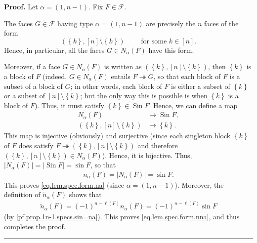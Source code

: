 \documentclass[12pt]{article}
\theoremstyle{definition}%
\theoremstyle{definition}%
\theoremstyle{remark}%
\newcommand{\tup}[1]{\left( #1 \right)}
\newcommand{\interval}[1]{\left[ #1 \right]} %
\newcommand{\set}[1]{\left\{ #1 \right\}}
\newcommand{\card}[1]{\left| #1 \right|} %
\newcommand{\CF}{\mathcal{F}}
\newcommand{\na}{n_{ \alpha } }%
\newcommand{\Na}{N_{ \alpha } }%
\newcommand{\nna}{\widetilde{n}_{ \alpha } }%
\newcommand{\Sin}{\operatorname{Sin}}
\newcommand{\con}{\twoheadrightarrow} %
\newenvironment{proof}[1][Proof]{\noindent\textbf{#1.} }{\ \rule{0.5em}{0.5em}}
\begin{document}
\begin{proof}
Let $\alpha = \tup{1, n-1}$.
Fix $F \in \CF$.

The faces $G \in \CF$ having type $\alpha = \tup{1, n-1}$
are precisely the $n$ faces of the form
\[
\tup{\set{k}, \interval{n} \setminus \set{k}}
\qquad \text{ for some }  k \in \interval{n}.
\]
Hence, in particular, all the faces $G \in \Na\tup{F}$ %
have this form.

Moreover, if a face $G \in \Na\tup{F}$ is written as $\tup{\set{k}, \interval{n} \setminus \set{k}}$, then $\set{k}$ is a block of $F$ (indeed, $G \in \Na\tup{F}$ entails $F \con G$, so that each block of $F$ is a subset of a block of $G$;
in other words, each block of $F$ is either a subset of $\set{k}$ or a subset of $\interval{n}\setminus\set{k}$;
but the only way this is possible is when $\set{k}$ is a block of $F$).
Thus, it must satisfy $\set{k} \in \Sin F$.
Hence, we can define a map
\begin{align*}
\Na\tup{F} &\to \Sin F, \\
\tup{\set{k}, \interval{n}\setminus\set{k}} &\mapsto \set{k}.
\end{align*}
This map is injective (obviously) and surjective (since each singleton block $\set{k}$ of $F$ does satisfy $F \con \tup{\set{k}, \interval{n}\setminus\set{k}}$ and therefore $\tup{\set{k}, \interval{n}\setminus\set{k}} \in \Na\tup{F}$).
Hence, it is bijective.
Thus, $\card{\Na\tup{F}} = \card{\Sin F} = \sin F$, so that
\begin{align}
\na\tup{F} = \card{\Na\tup{F}} = \sin F.
\label{pf.prop.1n-1.specs.sin=na}
\end{align}
This proves \eqref{eq.lem.spec.form.na} (since $\alpha = \tup{1, n-1}$).
Moreover, the definition of $\nna\tup{F}$ shows that
\begin{align}
\nna\tup{F}
= \tup{-1}^{n - \ell\tup{F}} \na\tup{F}
= \tup{-1}^{n - \ell\tup{F}} \sin F
\label{pf.prop.1n-1.specs.sin=nta}
\end{align}
(by \eqref{pf.prop.1n-1.specs.sin=na}).
This proves \eqref{eq.lem.spec.form.nna}, and thus completes the proof.
\end{proof}
\end{document}
